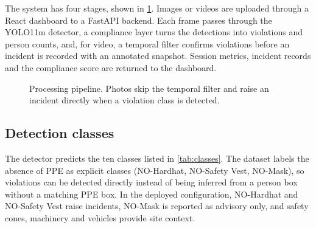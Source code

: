 \documentclass[preprint,12pt]{elsarticle}
\begin{document}
The system has four stages, shown in \cref{fig:architecture}. Images or videos are uploaded through a React dashboard to a FastAPI backend. Each frame passes through the YOLO11m detector, a compliance layer turns the detections into violations and person counts, and, for video, a temporal filter confirms violations before an incident is recorded with an annotated snapshot. Session metrics, incident records and the compliance score are returned to the dashboard.

\begin{figure}[htbp]
\centering
{}
\caption{Processing pipeline. Photos skip the temporal filter and raise an incident directly when a violation class is detected.}
\label{fig:architecture}
\end{figure}

\subsection{Detection classes}

The detector predicts the ten classes listed in \cref{tab:classes}. The dataset labels the absence of PPE as explicit classes (NO-Hardhat, NO-Safety Vest, NO-Mask), so violations can be detected directly instead of being inferred from a person box without a matching PPE box. In the deployed configuration, NO-Hardhat and NO-Safety Vest raise incidents, NO-Mask is reported as advisory only, and safety cones, machinery and vehicles provide site context.
\end{document}
